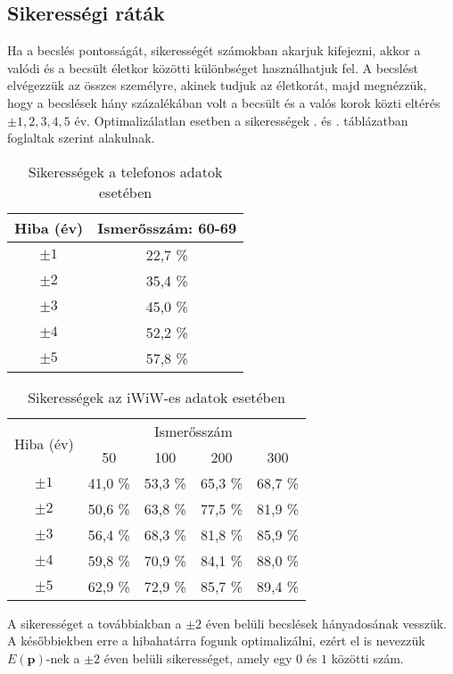\documentclass[12pt]{article}
\begin{document}
\subsection{Sikerességi ráták}
Ha a becslés pontosságát, sikerességét számokban akarjuk kifejezni, akkor a valódi és a becsült életkor közötti különbséget használhatjuk fel. A becslést elvégezzük az összes személyre, akinek tudjuk az életkorát, majd megnézzük, hogy a becslések hány százalékában volt a becsült és a valós korok közti eltérés $\pm 1, 2,3,4,5$ év. Optimalizálatlan esetben a sikerességek . és . táblázatban foglaltak szerint alakulnak.
\begin{table}[H]
	\centering
	\begin{tabular}{|c|c|}
		\hline
		Hiba (év) & Ismerősszám: 60-69 \\
		\hline
		$\pm 1$ & 22,7 \% \\
		\hline
		$\pm 2$ & 35,4 \% \\
		\hline
		$\pm 3$ & 45,0 \% \\
		\hline
		$\pm 4$ & 52,2 \% \\
		\hline
		$\pm 5$ & 57,8 \% \\
		\hline
	\end{tabular}
	\caption{Sikerességek a telefonos adatok esetében}
	\label{telefon_sikeresseg_nemopt} %
\end{table}
\begin{table}[H]
	\centering
	\begin{tabular}{|c|c|c|c|c|}
		\hline
		\multirow{2}{*}{Hiba (év)} & \multicolumn{4}{|c|}{Ismerősszám} \\ \cline{2-5} & 50 & 100 & 200 & 300 \\
		\hline
		$\pm 1$ & 41,0 \% & 53,3 \% & 65,3 \% & 68,7 \% \\
		\hline
		$\pm 2$ & 50,6 \% & 63,8 \% & 77,5 \% & 81,9 \% \\
		\hline
		$\pm 3$ & 56,4 \% & 68,3 \% & 81,8 \% & 85,9 \% \\
		\hline
		$\pm 4$ & 59,8 \% & 70,9 \% & 84,1 \% & 88,0 \% \\
		\hline
		$\pm 5$ & 62,9 \% & 72,9 \% & 85,7 \% & 89,4 \% \\
		\hline
	\end{tabular}
	\caption{Sikerességek az iWiW-es adatok esetében}
	\label{iwiw_sikeresseg_nemopt}
\end{table}
A sikerességet a továbbiakban a $\pm 2$ éven belüli becslések hányadosának vesszük. A későbbiekben erre a hibahatárra fogunk optimalizálni, ezért el is nevezzük $E(\mathbf{p})$-nek a $\pm 2$ éven belüli sikerességet, amely egy $0$ és $1$ közötti szám.
\end{document}
